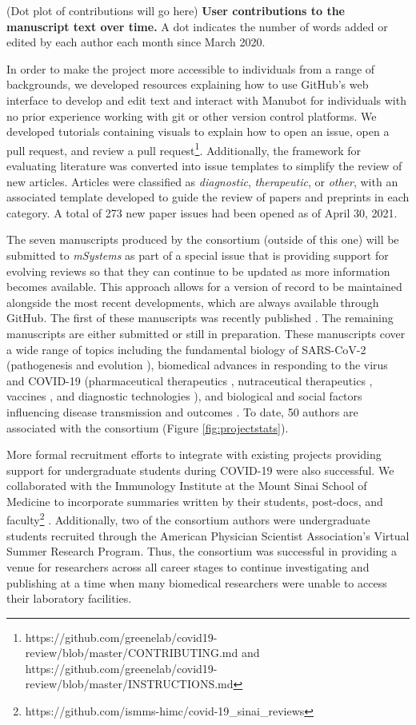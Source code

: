 \documentclass[twocolumn]{ceurart}
\begin{document}
(Dot plot of contributions will go here)
\textbf{User contributions to the manuscript text over time.}
A dot indicates the number of words added or edited by each author each month since March 2020.

In order to make the project more accessible to individuals from a range of backgrounds, we developed resources explaining how to use GitHub's web interface to develop and edit text and interact with Manubot for individuals with no prior experience working with git or other version control platforms.
We developed tutorials containing visuals to explain how to open an issue, open a pull request, and review a pull request\footnote{https://github.com/greenelab/covid19-review/blob/master/CONTRIBUTING.md and https://github.com/greenelab/covid19-review/blob/master/INSTRUCTIONS.md}.
Additionally, the framework for evaluating literature was converted into issue templates to simplify the review of new articles.
Articles were classified as \emph{diagnostic}, \emph{therapeutic}, or \emph{other}, with an associated template developed to guide the review of papers and preprints in each category.
A total of 273 new paper issues had been opened as of April 30, 2021.

The seven manuscripts produced by the consortium (outside of this one) will be submitted to \emph{mSystems} as part of a special issue that is providing support for evolving reviews so that they can continue to be updated as more information becomes available.
This approach allows for a version of record to be maintained alongside the most recent developments, which are always available through GitHub.
The first of these manuscripts was recently published \citep{wgAGKcBj}.
The remaining manuscripts are either submitted or still in preparation.
These manuscripts cover a wide range of topics including the fundamental biology of SARS-CoV-2 (pathogenesis \citep{r366f5T3} and evolution \citep{17qiILENK}), biomedical advances in responding to the virus and COVID-19 (pharmaceutical therapeutics \citep{cifK9B8t}, nutraceutical therapeutics \citep{wgAGKcBj}, vaccines \citep{i2CGFwI3}, and diagnostic technologies \citep{m8bOfc0M}), and biological and social factors influencing disease transmission and outcomes \citep{Up1vB19z}.
To date, 50 authors are associated with the consortium (Figure \ref{fig:projectstats}).

More formal recruitment efforts to integrate with existing projects providing support for undergraduate students during COVID-19 were also successful.
We collaborated with the Immunology Institute at the Mount Sinai School of Medicine to incorporate summaries written by their students, post-docs, and faculty\footnote{https://github.com/ismms-himc/covid-19\_sinai\_reviews} \citep{YZ4cHNuH}.
Additionally, two of the consortium authors were undergraduate students recruited through the American Physician Scientist Association's Virtual Summer Research Program.
Thus, the consortium was successful in providing a venue for researchers across all career stages to continue investigating and publishing at a time when many biomedical researchers were unable to access their laboratory facilities.
\end{document}
